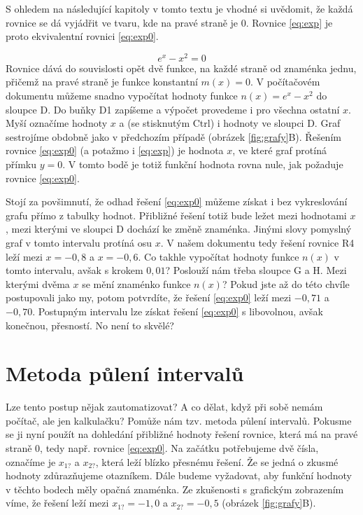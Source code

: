 \documentclass[a4paper,oneside,12pt]{article}
\begin{document}
S ohledem na následující kapitoly v tomto textu je vhodné
si uvědomit, že každá rovnice se dá vyjádřit ve tvaru,
kde na pravé straně je 0. Rovnice \ref{eq:exp} je
proto ekvivalentní rovnici \ref{eq:exp0}.

\begin{equation}
e^x - x^2 = 0
\label{eq:exp0}
\end{equation}
%
Rovnice dává do souvislosti opět dvě funkce, na každé straně 
od znaménka \uv{=} jednu, přičemž na pravé straně je funkce konstantní 
$m(x) = 0$. V počítačovém dokumentu můžeme snadno vypočítat
hodnoty funkce $n(x) = e^x - x^2$ do sloupce D. Do buňky D1
zapíšeme  a výpočet provedeme i pro 
všechna ostatní $x$. Myší označíme hodnoty $x$ a (se stisknutým
Ctrl) i hodnoty ve sloupci D. Graf sestrojíme obdobně jako
v předchozím případě (obrázek \ref{fig:grafy}B). Řešením rovnice \ref{eq:exp0}
(a potažmo i \ref{eq:exp}) je hodnota $x$, ve které graf protíná 
přímku $y=0$.
V tomto bodě je totiž funkční hodnota rovna nule, jak
požaduje rovnice \ref{eq:exp0}.

Stojí za povšimnutí, že odhad řešení \ref{eq:exp0} můžeme získat i bez
vykreslování grafu přímo z tabulky hodnot. Přibližné řešení totiž
bude ležet mezi hodnotami $x$, mezi kterými ve sloupci D dochází
ke změně znaménka. Jinými slovy pomyslný graf v tomto 
intervalu protíná osu $x$. V našem dokumentu tedy řešení
rovnice R4 leží mezi 
$x=-0,8$ a $x=-0,6$. Co takhle vypočítat hodnoty funkce $n(x)$ 
v tomto intervalu, avšak s krokem $0,01$? Poslouží nám třeba 
sloupce G a H. Mezi kterými dvěma $x$ se mění znaménko funkce
$n(x)$? Pokud jste až do této chvíle postupovali jako my, potom
potvrdíte, že řešení \ref{eq:exp0} leží mezi $-0,71$ a $-0,70$.
Postupným  intervalu lze získat řešení \ref{eq:exp0}
s libovolnou, avšak konečnou, přesností. No není to skvělé?


\section{Metoda půlení intervalů}

Lze tento postup nějak zautomatizovat? A co dělat, když při sobě
nemám počítač, ale jen  kalkulačku? Pomůže nám 
tzv. metoda půlení intervalů. Pokusme se ji nyní použít na 
dohledání přibližné hodnoty řešení rovnice, která má na 
pravé straně 0, tedy např. rovnice \ref{eq:exp0}. Na začátku 
potřebujeme dvě čísla, označíme je $x_{1?}$ a $x_{2?}$, 
která leží blízko přesnému řešení. Že se jedná o zkusmé hodnoty
zdůrazňujeme otazníkem. Dále budeme vyžadovat, aby funkční
hodnoty v těchto bodech měly opačná znaménka. Ze zkušenosti
s grafickým zobrazením víme, že řešení leží 
mezi $x_{1?} = -1,0$ a $x_{2?} = -0,5$ (obrázek \ref{fig:grafy}B).
\end{document}
